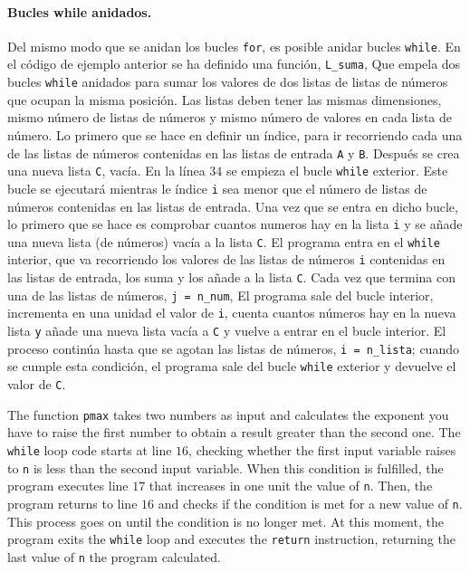 \begin{paracol}{2}
\paragraph{Bucles while anidados.}  Del mismo modo que se anidan los bucles \texttt{for}, es posible anidar bucles \texttt{while}.
En el código de ejemplo anterior se ha definido una función, \texttt{L_suma}, Que empela dos bucles \texttt{while} anidados para sumar los valores de dos listas de listas de números que ocupan la misma posición. Las listas deben tener las mismas dimensiones, mismo número de listas de números y mismo número de valores en cada lista de número. Lo primero que se hace en definir un índice, para ir recorriendo cada una de las listas de números contenidas en las listas de entrada \texttt{A} y \texttt{B}. Después se crea una nueva lista \texttt{C}, vacía. En la línea $34$ se empieza el bucle \texttt{while} exterior. Este bucle se ejecutará mientras le índice \texttt{i} sea menor que el número de listas de números contenidas en las listas de entrada. Una vez que se entra en dicho bucle, lo primero que se hace es comprobar cuantos numeros hay en la lista \texttt{i} y se añade una nueva lista (de números) vacía a la lista \texttt{C}. El programa entra en el \texttt{while} interior, que va recorriendo los valores de las listas de números \texttt{i} contenidas en las listas de entrada, los suma y los añade a la lista \texttt{C}. Cada vez que termina con una de las listas de números, \texttt{j = n_num}, El programa sale del bucle interior, incrementa en una unidad el valor de \texttt{i}, cuenta cuantos números hay en la nueva lista \texttt{y} añade una nueva lista vacía a \texttt{C} y vuelve a entrar en el bucle interior. El proceso continúa hasta que se agotan las listas de números, \texttt{i = n_lista}; cuando se cumple esta condición, el programa sale del bucle \texttt{while} exterior y devuelve el valor de \texttt{C}.

\switchcolumn
The function \texttt{pmax} takes two numbers as input and calculates the exponent you have to raise the first number to obtain a result greater than the second one. The \texttt{while} loop code starts at line $16$, checking whether the first input variable raises to \texttt{n} is less than the second input variable. When this condition is fulfilled, the program executes line $17$ that increases in one unit the value of \texttt{n}. Then, the program returns to line $16$ and checks if the condition is met for a new value of \texttt{n}. This process goes on until the condition is no longer met. At this moment, the program exits the \texttt{while} loop and executes the \texttt{return} instruction, returning the last value of \texttt{n} the program calculated.


\end{paracol}
